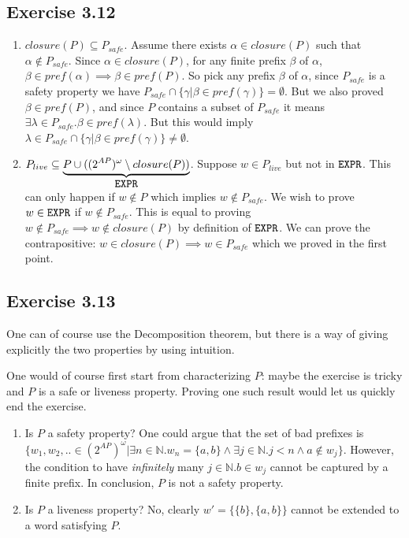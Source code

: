 \documentclass{article}
\begin{document}
	\subsection*{Exercise 3.12}
	\begin{enumerate}[label=\arabic*.]
		\item $closure(P) \subseteq P_{safe}$. Assume there exists $\alpha \in closure(P)$ such that $\alpha \notin P_{safe}$. Since $\alpha \in closure(P)$, for any finite prefix $\beta$ of $\alpha$, $\beta \in pref(\alpha) \implies \beta \in pref(P)$. So pick any prefix $\beta$ of $\alpha$, since $P_{safe}$ is a safety property we have $P_{safe} \cap \{\gamma | \beta \in pref(\gamma)\}=\emptyset$. But we also proved $\beta \in pref(P)$, and since $P$ contains a subset of $P_{safe}$ it means $\exists \lambda \in P_{safe}. \beta \in pref(\lambda)$. But this would imply $\lambda \in P_{safe} \cap \{\gamma | \beta \in pref(\gamma)\} \neq \emptyset$.
	\item $P_{live} \subseteq \underbrace{P \cup ((2^{AP})^\omega \setminus closure(P))}_{\verb|EXPR|}$. Suppose $w \in P_{live}$ but not in $\verb|EXPR|$. This can only happen if $w \notin P$ which implies $w \notin P_{safe}$. We wish to prove $w \in \verb|EXPR|$ if $w \notin P_{safe}$. This is equal to proving $w \notin P_{safe} \implies w \notin closure(P)$ by definition of $\verb|EXPR|$. We can prove the contrapositive: $w \in closure(P) \implies w \in P_{safe}$ which we proved in the first point.
	\end{enumerate}
	\subsection*{Exercise 3.13}
	One can of course use the Decomposition theorem, but there is a way of giving explicitly the two properties by using intuition.
	
	One would of course first start from characterizing $P$: maybe the exercise is tricky and $P$ is a safe or liveness property. Proving one such result would let us quickly end the exercise.
	
	\begin{enumerate}[label=\alph*.]
		\item Is $P$ a safety property? One could argue that the set of bad prefixes is $\{w_1,w_2,.. \in (2^{AP})^{\omega} | \exists n \in \mathbb{N}. w_n = \{a,b\} \land \exists j \in \mathbb{N}. j < n \land a \notin w_j\}$. However, the condition to have \textit{infinitely} many $j \in \mathbb{N}. b \in w_j$ cannot be captured by a finite prefix. In conclusion, $P$ is not a safety property.
		\item Is $P$ a liveness property? No, clearly $w'=\{\{b\}, \{a,b\}\}$ cannot be extended to a word satisfying $P$.
	\end{enumerate}
	
\end{document}
